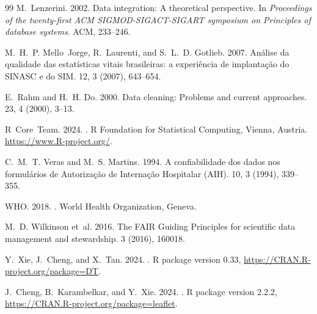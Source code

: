 \documentclass[sigconf, nonacm, screen, language=portuguese, language=spanish, language={main=english}]{acmart}
\begin{document}
\begin{thebibliography}{99}
M.~Lenzerini. 2002.
\newblock Data integration: A theoretical perspective.
\newblock In {\em Proceedings of the twenty-first ACM SIGMOD-SIGACT-SIGART symposium on Principles of database systems}. ACM, 233--246.

M.~H.~P. Mello~Jorge, R.~Laurenti, and S.~L.~D. Gotlieb. 2007.
\newblock Análise da qualidade das estatísticas vitais brasileiras: a experiência de implantação do SINASC e do SIM.
 12, 3 (2007), 643--654.

E.~Rahm and H.~H. Do. 2000.
\newblock Data cleaning: Problems and current approaches.
 23, 4 (2000), 3--13.

R~Core~Team. 2024.
.
\newblock R Foundation for Statistical Computing, Vienna, Austria. \url{https://www.R-project.org/}.

C.~M.~T. Veras and M.~S. Martins. 1994.
\newblock A confiabilidade dos dados nos formulários de Autorização de Internação Hospitalar (AIH).
 10, 3 (1994), 339--355.

WHO. 2018.
.
\newblock World Health Organization, Geneva.

M.~D. Wilkinson et~al. 2016.
\newblock The FAIR Guiding Principles for scientific data management and stewardship.
 3 (2016), 160018.

Y.~Xie, J.~Cheng, and X.~Tan. 2024.
.
\newblock R package version 0.33, \url{https://CRAN.R-project.org/package=DT}.

J.~Cheng, B.~Karambelkar, and Y.~Xie. 2024.
.
\newblock R package version 2.2.2, \url{https://CRAN.R-project.org/package=leaflet}.

\end{thebibliography}
\end{document}
